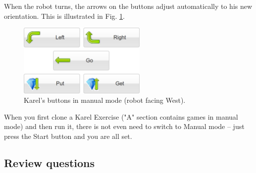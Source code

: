 \documentclass[article,A4,12pt]{llncs}
\begin{document}
When the robot turns, the arrows on the buttons adjust automatically to his new 
orientation. This is illustrated in Fig. \ref{fig:buttons2}.
\begin{figure}[!ht]
\begin{center}
\includegraphics[width=6.2cm]{img/buttons-all-2.png}
\vspace{-0mm}
\caption{Karel's buttons in manual mode (robot facing West).}
\label{fig:buttons2}
\end{center}
\end{figure}

\noindent
When you first clone a Karel Exercise ("A" section contains 
games in manual mode) and then 
run it, there is not even need to switch to Manual mode -- just press the Start button and you are 
all set.

\subsection{Review questions}
\end{document}
